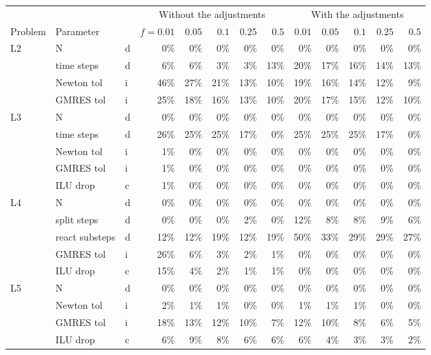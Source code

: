 \begin{tabular}{lllrrrrrrrrrr}
\toprule
& & & \multicolumn{5}{c}{Without the adjustments} & \multicolumn{5}{c}{With the adjustments} \\
\cmidrule(lr){4-8}\cmidrule(lr){9-13}
Problem & Parameter & & $f{=}0.01$ & $0.05$ & $0.1$ & $0.25$ & $0.5$ & $0.01$ & $0.05$ & $0.1$ & $0.25$ & $0.5$ \\
\midrule
L2 & N & d & 0\% & 0\% & 0\% & 0\% & 0\% & 0\% & 0\% & 0\% & 0\% & 0\% \\
 & time steps & d & 6\% & 6\% & 3\% & 3\% & 13\% & 20\% & 17\% & 16\% & 14\% & 13\% \\
 & Newton tol & i & 46\% & 27\% & 21\% & 13\% & 10\% & 19\% & 16\% & 14\% & 12\% & 9\% \\
 & GMRES tol & i & 25\% & 18\% & 16\% & 13\% & 10\% & 20\% & 17\% & 15\% & 12\% & 10\% \\
\addlinespace[1pt]
L3 & N & d & 0\% & 0\% & 0\% & 0\% & 0\% & 0\% & 0\% & 0\% & 0\% & 0\% \\
 & time steps & d & 26\% & 25\% & 25\% & 17\% & 0\% & 25\% & 25\% & 25\% & 17\% & 0\% \\
 & Newton tol & i & 1\% & 0\% & 0\% & 0\% & 0\% & 0\% & 0\% & 0\% & 0\% & 0\% \\
 & GMRES tol & i & 1\% & 0\% & 0\% & 0\% & 0\% & 0\% & 0\% & 0\% & 0\% & 0\% \\
 & ILU drop & c & 1\% & 0\% & 0\% & 0\% & 0\% & 0\% & 0\% & 0\% & 0\% & 0\% \\
\addlinespace[1pt]
L4 & N & d & 0\% & 0\% & 0\% & 0\% & 0\% & 0\% & 0\% & 0\% & 0\% & 0\% \\
 & split steps & d & 0\% & 0\% & 0\% & 2\% & 0\% & 12\% & 8\% & 8\% & 9\% & 6\% \\
 & react substeps & d & 12\% & 12\% & 19\% & 12\% & 19\% & 50\% & 33\% & 29\% & 29\% & 27\% \\
 & GMRES tol & i & 26\% & 6\% & 3\% & 2\% & 1\% & 0\% & 0\% & 0\% & 0\% & 0\% \\
 & ILU drop & c & 15\% & 4\% & 2\% & 1\% & 1\% & 0\% & 0\% & 0\% & 0\% & 0\% \\
\addlinespace[1pt]
L5 & N & d & 0\% & 0\% & 0\% & 0\% & 0\% & 0\% & 0\% & 0\% & 0\% & 0\% \\
 & Newton tol & i & 2\% & 1\% & 1\% & 0\% & 0\% & 1\% & 1\% & 1\% & 0\% & 0\% \\
 & GMRES tol & i & 18\% & 13\% & 12\% & 10\% & 7\% & 12\% & 10\% & 8\% & 6\% & 5\% \\
 & ILU drop & c & 6\% & 9\% & 8\% & 6\% & 6\% & 6\% & 4\% & 3\% & 3\% & 2\% \\

\end{tabular}
